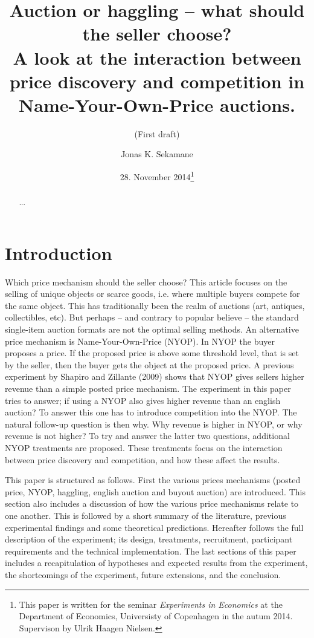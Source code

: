 \documentclass[a4paper,12pt]{article}
\title{\Large {\bf Auction or haggling -- what should the seller choose?} \\ A look at the interaction between price discovery and competition in Name-Your-Own-Price auctions.}
\subtitle{(First draft)}
\author{Jonas K. Sekamane}
\date{28. November 2014\thanks{This paper is written for the seminar \emph{Experiments in Economics} at the Department of Economics, Universisty of Copenhagen in the autum 2014. Supervison by Ulrik Haagen Nielsen.}}
\begin{document}
	
	\clearpage
	\thispagestyle{empty}
	
	\maketitle{}
		
	\newpage
	
	\clearpage %
	\setcounter{page}{1}
	
	\begin{abstract}
		{...}
	\end{abstract}
	
	\tableofcontents
	
	\newpage

	\section{Introduction}

	Which price mechanism should the seller choose? This article focuses on the selling of unique objects or scarce goods, i.e. where multiple buyers compete for the same object. This has traditionally been the realm of auctions (art, antiques, collectibles, etc). But perhaps -- and contrary to popular believe -- the standard single-item auction formats are not the optimal selling methods. An alternative price mechanism is Name-Your-Own-Price (NYOP). In NYOP the buyer proposes a price. If the proposed price is above some threshold level, that is set by the seller, then the buyer gets the object at the proposed price. A previous experiment by Shapiro and Zillante (2009) shows that NYOP gives sellers higher revenue than a simple posted price mechanism. The experiment in this paper tries to answer; if using a NYOP also gives higher revenue than an english auction? To answer this one has to introduce competition into the NYOP. The natural follow-up question is then why. Why revenue is higher in NYOP, or why revenue is not higher? To try and answer the latter two questions, additional NYOP treatments are proposed. These treatments focus on the interaction between price discovery and competition, and how these affect the results.

	This paper is structured as follows. First the various prices mechanisms (posted price, NYOP, haggling, english auction and buyout auction) are introduced. This section also includes a discussion of how the various price mechanisms relate to one another. This is followed by a short summary of the literature, previous experimental findings and some theoretical predictions. Hereafter follows the full description of the experiment; its design, treatments, recruitment, participant requirements and the technical implementation. The last sections of this paper includes a recapitulation of hypotheses and expected results from the experiment, the shortcomings of the experiment, future extensions, and the conclusion.
\end{document}
